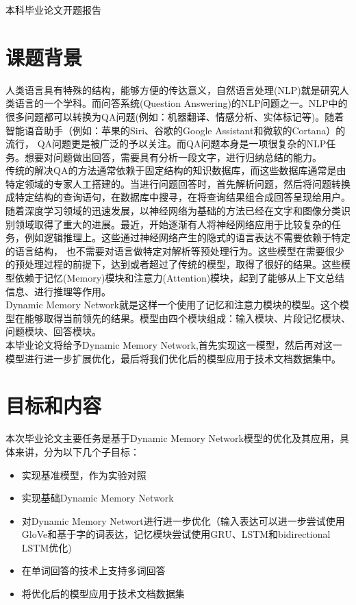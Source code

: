 \setcounter{page}{1}
{\sanhao\heiti\filcenter \centerline{本科毕业论文开题报告}}
\section{课题背景}

人类语言具有特殊的结构，能够方便的传达意义，自然语言处理(NLP)就是研究人类语言的一个学科。而问答系统(Question Answering)的NLP问题之一。NLP中的很多问题都可以转换为QA问题(例如：机器翻译、情感分析、实体标记等)。随着智能语音助手（例如：苹果的Siri、谷歌的Google Assistant和微软的Cortana）的流行，
QA问题更是被广泛的予以关注。而QA问题本身是一项很复杂的NLP任务。想要对问题做出回答，需要具有分析一段文字，进行归纳总结的能力。\\
传统的解决QA的方法通常依赖于固定结构的知识数据库，而这些数据库通常是由特定领域的专家人工搭建的。当进行问题回答时，首先解析问题，然后将问题转换成特定结构的查询语句，在数据库中搜寻，在将查询结果组合成回答呈现给用户。\\
随着深度学习领域的迅速发展，以神经网络为基础的方法已经在文字和图像分类识别领域取得了重大的进展。最近，开始逐渐有人将神经网络应用于比较复杂的任务，例如逻辑推理上。这些通过神经网络产生的隐式的语言表达不需要依赖于特定的语言结构，
也不需要对语言做特定对解析等预处理行为。这些模型在需要很少的预处理过程的前提下，达到或者超过了传统的模型，取得了很好的结果。这些模型依赖于记忆(Memory)模块和注意力(Attention)模块，起到了能够从上下文总结信息、进行推理等作用。\\
Dynamic Memory Network就是这样一个使用了记忆和注意力模块的模型。这个模型在能够取得当前领先的结果。模型由四个模块组成：输入模块、片段记忆模块、问题模块、回答模块。\\
本毕业论文将给予Dynamic Memory Network,首先实现这一模型，然后再对这一模型进行进一步扩展优化，最后将我们优化后的模型应用于技术文档数据集中。\\
\section{目标和内容}
本次毕业论文主要任务是基于Dynamic Memory Network模型的优化及其应用，具体来讲，分为以下几个子目标：
\begin{itemize}
\item 实现基准模型，作为实验对照
\item 实现基础Dynamic Memory Network
\item 对Dynamic Memory Networt进行进一步优化（输入表达可以进一步尝试使用GloVe和基于字的词表达，记忆模块尝试使用GRU、LSTM和bidirectional LSTM优化)
\item 在单词回答的技术上支持多词回答
\item 将优化后的模型应用于技术文档数据集
\end{itemize} 
